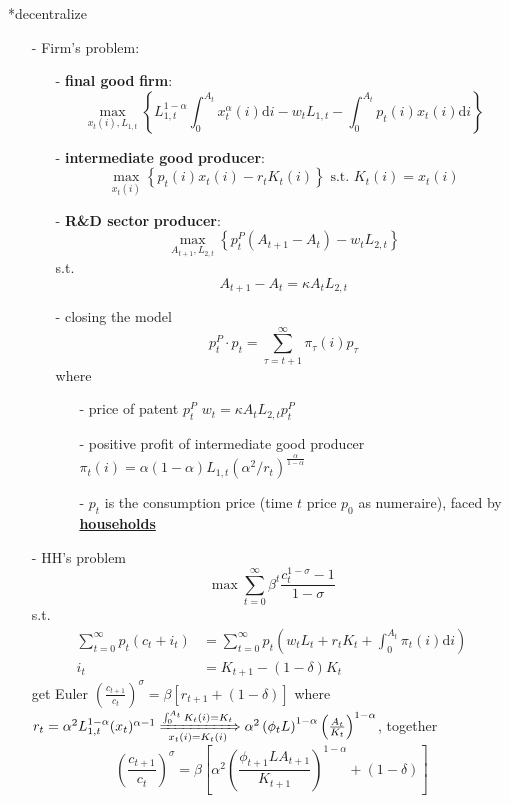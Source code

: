 \documentclass[10pt,a4paper]{article}
\makeatletter
\renewcommand{\subsubsection}{\@startsection{subsubsection}{1}{0mm}{.2ex}{.2ex}{\bfseries}}
\makeatother
\begin{document}
\begin{multicols*}{3}
\subsubsection*{decentralize}
\begin{itemize}
    \item[-] Firm's problem:
    \begin{itemize}
        \item[-] \textbf{\color{myred}final good} \textbf{firm}: $$\max_{x_t(i),L_{1,t}}\left\{ L_{1,t}^{1-\alpha}\int^{A_t}_0 x_t^{\alpha}(i)\mathrm{d}i-w_tL_{1,t}-\int^{A_t}_0 p_t(i)x_t(i)\mathrm{d}i \right\}$$
        \item[-] \textbf{\color{myred}intermediate good} \textbf{producer}: $$
    \max_{x_t(i)}\left\{ p_t(i)x_t(i)-r_tK_t(i) \right\} \text{ s.t. } K_t(i)=x_t(i)
    $$
    \item[-] \textbf{\color{myred}R\&D sector} \textbf{producer}:
    $$
    \max_{A_{t+1},L_{2,t}}\left\{ p_t^P(A_{t+1}-A_t)-w_tL_{2,t} \right\}
    $$
    s.t.
    $$
    A_{t+1}-A_t = \kappa A_tL_{2,t}
    $$
    \item[-] closing the model
    $$
    p_t^P\cdot p_t = \sum^{\infty}_{\tau = t+1}\pi_{\tau}(i)p_{\tau}
    $$
    where 
    \begin{itemize}
        \item[-] price of patent $p_t^P$ $w_t=\kappa A_t L_{2,t} p^P_t$ 
        \item[-] positive profit of intermediate good producer $\pi_t(i)=\alpha(1-\alpha)L_{1,t}(\alpha^2/r_t)^{\frac{\alpha}{1-\alpha}}$
        \item[-] $p_t$ is the consumption price (time $t$ price $p_0$ as numeraire), faced by \underline{\textbf{households}}
    \end{itemize}
    \end{itemize}
    \item[-] HH's problem
     $$
    \max \sum^{\infty}_{t=0}\beta^t \frac{c_t^{1-\sigma}-1}{1-\sigma}
    $$
    s.t.
\begin{align*}
    \sum^{\infty}_{t=0}p_t(c_t+i_t) & =\sum^{\infty}_{t=0} p_t(w_t L_t+r_t K_t+\int^{A_t}_0\pi_t(i)\mathrm{d}i)\\
    i_t &= K_{t+1}-(1-\delta)K_t
\end{align*}
get Euler $\left(\frac{c_{t+1}}{c_t}\right)^{\sigma} = \beta\left[r_{t+1}+(1-\delta)\right]
$
where $r_t = \alpha^2 L_{1,t}^{1-\alpha}(x_t)^{\alpha-1} \xRightarrow[x_t(i)=K_t(i)]{\int^{A_t}_0 K_t(i)=K_t} \alpha^2 \left(\phi_t L\right)^{1-\alpha} \left(\frac{A_t}{K_t}\right)^{1-\alpha}$, together
$$
\left(\frac{c_{t+1}}{c_t}\right)^{\sigma} = \beta\left[ \alpha^2 \left(\frac{\phi_{t+1}L A_{t+1}}{K_{t+1}}\right)^{1-\alpha}+(1-\delta) \right]
$$
\end{itemize}


\end{multicols*}
\end{document}
